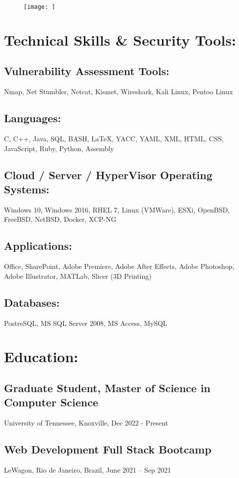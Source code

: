 \documentclass[letter,10pt]{article}
\begin{document}
\begin{figure}
\texttt{[image: ]}
\end{figure}

\section*{Technical Skills \& Security Tools:}
\label{sec:org5d61f7f}
\subsection*{Vulnerability Assessment Tools:}
\label{sec:org9c0d2d7}
Nmap, Net Stumbler, Netcat, Kismet, Wireshark, Kali Linux, Pentoo Linux
\subsection*{Languages:}
\label{sec:org9c5f269}
C, C++, Java, SQL, BASH, \LaTeX{}, YACC, YAML, XML, HTML, CSS, JavaScript, Ruby, Python, Assembly
\subsection*{Cloud / Server / HyperVisor Operating Systems:}
\label{sec:org2b35cc9}
Windows 10, Windows 2016, RHEL 7, Linux  (VMWare), ESXi, OpenBSD, FreeBSD, NetBSD, Docker, XCP-NG
\subsection*{Applications:}
\label{sec:org457b076}
Office, SharePoint, Adobe Premiere, Adobe After Effects, Adobe Photoshop, Adobe Illustrator, MATLab, Slicer (3D Printing)
\subsection*{Databases:}
\label{sec:org500cbe2}
PostreSQL, MS SQL Server 2008, MS Access, MySQL
\section*{Education:}
\label{sec:orgdee4ded}
\subsection*{Graduate Student, Master of Science in Computer Science}
\label{sec:org81bf0fc}
University of Tennessee, Knoxville, Dec 2022 - Present
\subsection*{Web Development Full Stack Bootcamp}
\label{sec:org05e554c}
LeWagon, Rio de Janeiro, Brazil, June 2021 – Sep 2021
\end{document}
